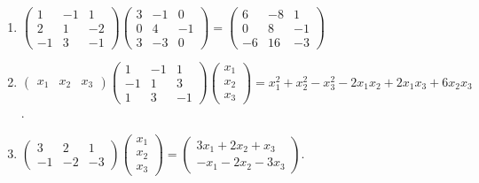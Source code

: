 \begin{enumerate}
			 \item %
			       $\begin{pmatrix}
					       1  & -1 & 1  \\
					       2  & 1  & -2 \\
					       -1 & 3  & -1
				       \end{pmatrix}
				       \begin{pmatrix}
					       3 & -1 & 0  \\
					       0 & 4  & -1 \\
					       3 & -3 & 0
				       \end{pmatrix} =
				       \begin{pmatrix}
					       6  & -8 & 1  \\
					       0  & 8  & -1 \\
					       -6 & 16 & -3
				       \end{pmatrix}$

			 \item %
			       $\begin{pmatrix}
					       x_1 & x_2 & x_3
				       \end{pmatrix}
				       \begin{pmatrix}
					       1  & -1 & 1  \\
					       -1 & 1  & 3  \\
					       1  & 3  & -1
				       \end{pmatrix}
				       \begin{pmatrix}
					       x_1 \\
					       x_2 \\
					       x_3
				       \end{pmatrix} =
				       x_1^2 + x_2^2 - x_3^2 - 2x_1x_2 + 2x_1x_3 + 6x_2x_3$.

			 \item %
			       $\begin{pmatrix}
					       3  & 2  & 1  \\
					       -1 & -2 & -3
				       \end{pmatrix}
				       \begin{pmatrix}
					       x_1 \\
					       x_2 \\
					       x_3
				       \end{pmatrix} =
				       \begin{pmatrix}
					       3x_1 + 2x_2 + x_3 \\
					       -x_1 - 2x_2 - 3x_3
				       \end{pmatrix}$.
		 \end{enumerate}


